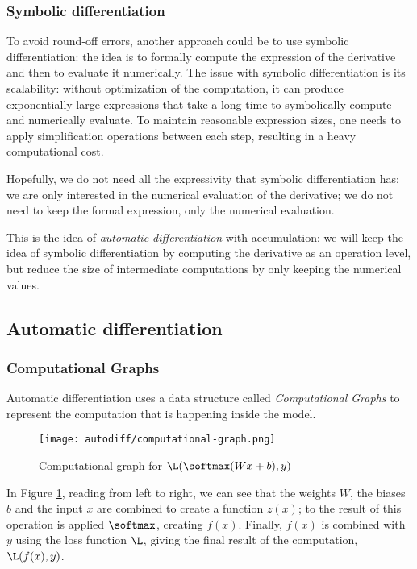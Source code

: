 \subsubsection{Symbolic differentiation}
To avoid round-off errors, another approach could be to use symbolic differentiation: the idea is to formally compute the expression of the derivative and then to evaluate it numerically. The issue with symbolic differentiation is its scalability: without optimization of the computation, it can produce exponentially large expressions that take a long time to symbolically compute and numerically evaluate. To maintain reasonable expression sizes, one needs to apply simplification operations between each step, resulting in a heavy computational cost.

Hopefully, we do not need all the expressivity that symbolic differentiation has: we are only interested in the numerical evaluation of the derivative; we do not need to keep the formal expression, only the numerical evaluation. 

This is the idea of \emph{automatic differentiation} with accumulation: we will keep the idea of symbolic differentiation by computing the derivative as an operation level, but reduce the size of intermediate computations by only keeping the numerical values.

\subsection{Automatic differentiation}
\subsubsection{Computational Graphs}
Automatic differentiation uses a data structure called \emph{Computational Graphs} to represent the computation that is happening inside the model.
\begin{figure}[H]
    \centering
    \texttt{[image: autodiff/computational-graph.png]}
    \caption{Computational graph for $\L(\softmax(Wx+b), y)$}
    \label{fig:computational-graph}
\end{figure}
In Figure \ref{fig:computational-graph}, reading from left to right, we can see that the weights $W$, the biases $b$ and the input $x$ are combined to create a function $z(x)$; to the result of this operation is applied $\softmax$, creating $f(x)$. Finally, $f(x)$ is combined with $y$ using the loss function $\L$, giving the final result of the computation, $\L(f(x), y)$.

